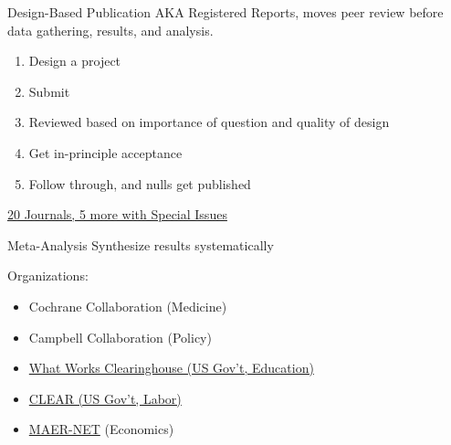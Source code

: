 \documentclass{beamer}
\begin{document}
\begin{frame}{Design-Based Publication}
AKA Registered Reports, moves peer review before data gathering, results, and analysis.

\begin{enumerate}[<.->]
\item Design a project
\item Submit
\item Reviewed based on importance of question and quality of design
\item Get in-principle acceptance
\item Follow through, and nulls get published
\end{enumerate}
\href{https://osf.io/8mpji/wiki/home/}{20 Journals, 5 more with Special Issues }
\end{frame}

{ %
    \begin{frame}[plain, label=AEAreg]
     \end{frame}
}

\begin{frame}{Meta-Analysis}
Synthesize results systematically

\vspace{.2in}
Organizations:
\begin{itemize}[<.->]
\item Cochrane Collaboration (Medicine)
\item Campbell Collaboration (Policy)
\item \href{http://ies.ed.gov/ncee/wwc/}{What Works Clearinghouse (US Gov't, Education)}
\item \href{http://clear.dol.gov/}{CLEAR (US Gov't, Labor)}
\item \href{https://www.hendrix.edu/maer-network/}{MAER-NET} (Economics)
\end{itemize}
\end{frame}
\end{document}
